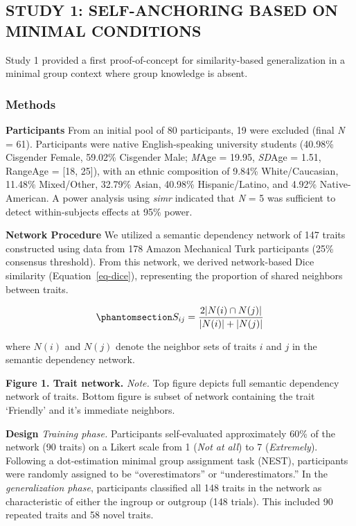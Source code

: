 \documentclass[
  man,
  longtable,
  nolmodern,
  notxfonts,
  notimes,
  man]{apa7}
\begin{document}
\subsection{STUDY 1: SELF-ANCHORING BASED ON MINIMAL
CONDITIONS}\label{study-1-self-anchoring-based-on-minimal-conditions}

Study 1 provided a first proof-of-concept for similarity-based
generalization in a minimal group context where group knowledge is
absent.

\subsubsection{Methods}\label{methods}

\textbf{Participants} From an initial pool of 80 participants, 19 were
excluded (final \emph{N} = 61). Participants were native
English-speaking university students (40.98\% Cisgender Female, 59.02\%
Cisgender Male; \emph{M}Age = 19.95, \emph{SD}Age = 1.51, RangeAge =
{[}18, 25{]}), with an ethnic composition of 9.84\% White/Caucasian,
11.48\% Mixed/Other, 32.79\% Asian, 40.98\% Hispanic/Latino, and 4.92\%
Native-American. A power analysis using \emph{simr} indicated that
\emph{N} = 5 was sufficient to detect within-subjects effects at 95\%
power.

\textbf{Network Procedure} We utilized a semantic dependency network of
147 traits constructed using data from 178 Amazon Mechanical Turk
participants (25\% consensus threshold). From this network, we derived
network-based Dice similarity (Equation~\ref{eq-dice}), representing the
proportion of shared neighbors between traits.

\begin{equation}\phantomsection\label{eq-dice}{S_{ij} = \frac{2|N(i) \cap N(j)|}{|N(i)| + |N(j)|}}\end{equation}

where \(N(i)\) and \(N(j)\) denote the neighbor sets of traits \(i\) and
\(j\) in the semantic dependency network.

\textbf{Figure 1. Trait network.} \emph{Note.} Top figure depicts full
semantic dependency network of traits. Bottom figure is subset of
network containing the trait `Friendly' and it's immediate neighbors.

\textbf{Design} \emph{Training phase.} Participants self-evaluated
approximately 60\% of the network (90 traits) on a Likert scale from 1
(\emph{Not at all}) to 7 (\emph{Extremely}). Following a dot-estimation
minimal group assignment task (NEST), participants were randomly
assigned to be ``overestimators'' or ``underestimators.'' In the
\emph{generalization phase}, participants classified all 148 traits in
the network as characteristic of either the ingroup or outgroup (148
trials). This included 90 repeated traits and 58 novel traits.
\end{document}
